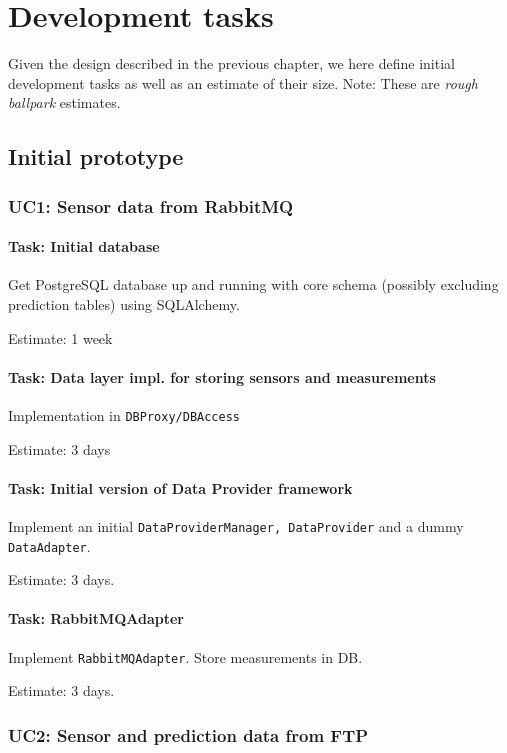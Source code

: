 \chapter{Development tasks}
Given the design described in the previous chapter, we here define initial development tasks as well as an estimate of their size. 
Note: These are \emph{rough ballpark} estimates.




\section{Initial prototype}

\subsection*{UC1: Sensor data from RabbitMQ}
\subsubsection{Task: Initial database}
Get PostgreSQL database up and running with core schema (possibly excluding prediction tables) using SQLAlchemy.

Estimate: 1 week


\subsubsection{ Task: Data layer impl. for storing sensors and measurements}
Implementation in \texttt{DBProxy/DBAccess}

Estimate: 3 days


\subsubsection{Task: Initial version of Data Provider framework}
Implement an initial \texttt{DataProviderManager, DataProvider} and a dummy \texttt{DataAdapter}.

Estimate: 3 days.

\subsubsection{Task: RabbitMQAdapter}
Implement \texttt{RabbitMQAdapter}. Store measurements in DB.

Estimate: 3 days.

\subsection*{UC2: Sensor and prediction data from FTP}
